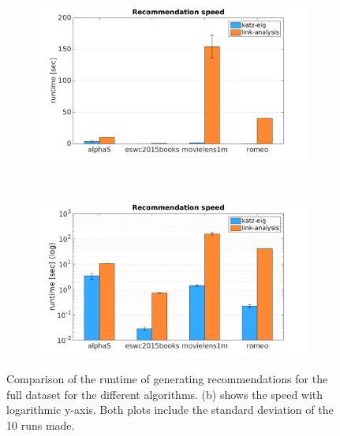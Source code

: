 \begin{figure}[h!]
    \begin{subfigure}[h!]{0.5\textwidth}
        \includegraphics[width=\textwidth]{fig/comp/comp_rec_speed.png}
        \caption{}
    \end{subfigure}
    ~
    \begin{subfigure}[h!]{0.5\textwidth}
        \includegraphics[width=\textwidth]{fig/comp/comp_rec_speed_log.png}
        \caption{}
    \end{subfigure}
    \caption{Comparison of the runtime of generating recommendations for the full dataset for the different algorithms. (b) shows the speed with logarithmic y-axis. Both plots include the standard deviation of the 10 runs made.}
\end{figure}

